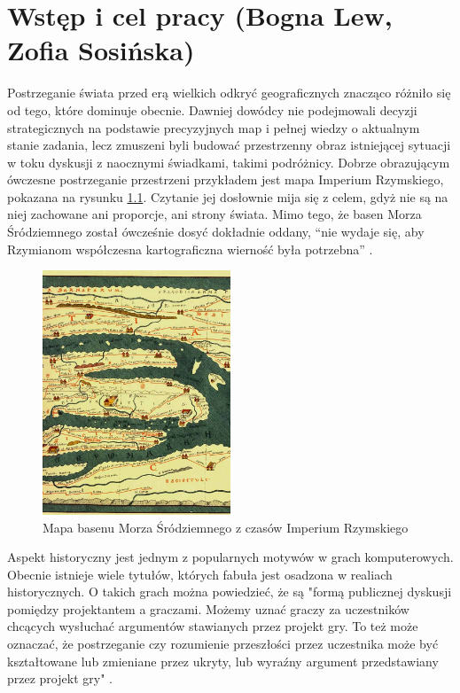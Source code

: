 \chapter{Wstęp i cel pracy (Bogna Lew, Zofia Sosińska)}\label{chap:introduction}

Postrzeganie świata przed erą wielkich odkryć geograficznych znacząco różniło się od tego, które dominuje obecnie. Dawniej
dowódcy nie podejmowali decyzji strategicznych na podstawie precyzyjnych map i pełnej wiedzy o aktualnym stanie zadania,
lecz zmuszeni byli budować przestrzenny obraz istniejącej sytuacji w toku dyskusji z naocznymi świadkami, takimi podróżnicy.
Dobrze obrazującym ówczesne postrzeganie
przestrzeni przykładem jest mapa Imperium Rzymskiego, pokazana na rysunku \ref{fig:mapaIR}. Czytanie jej dosłownie mija się z
celem, gdyż nie są na niej zachowane ani proporcje, ani strony świata. Mimo tego, że basen Morza Śródziemnego został
ówcześnie dosyć dokładnie oddany, “nie wydaje się, aby Rzymianom współczesna kartograficzna wierność była potrzebna” \cite{gbobrektvgry}.

\begin{figure}[htbp]
    \centering
    \includegraphics[width=0.5\textwidth]{images/mapaIR.jpg}
    \caption[]{Mapa basenu Morza Śródziemnego z czasów Imperium Rzymskiego\protect\footnotemark}\label{fig:mapaIR}
\end{figure}
Aspekt historyczny jest jednym z popularnych motywów w grach komputerowych. Obecnie istnieje wiele tytułów, których
fabuła jest osadzona w realiach historycznych. O takich grach można powiedzieć, że są "formą publicznej dyskusji
pomiędzy projektantem a graczami. Możemy uznać graczy za uczestników chcących wysłuchać argumentów stawianych przez
projekt gry. To też może oznaczać, że postrzeganie czy rozumienie przeszłości przez uczestnika może być kształtowane lub
zmieniane przez ukryty, lub wyraźny argument przedstawiany przez projekt gry" \cite{perception_past}.

